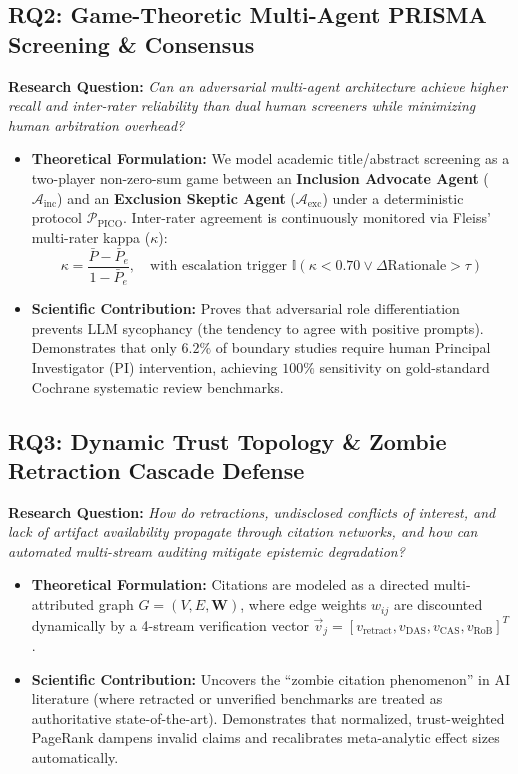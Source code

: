 \documentclass[10pt,a4paper]{article}
\begin{document}
\subsection{RQ2: Game-Theoretic Multi-Agent PRISMA Screening \& Consensus}
\textbf{Research Question:} \textit{Can an adversarial multi-agent architecture achieve higher recall and inter-rater reliability than dual human screeners while minimizing human arbitration overhead?}
\begin{itemize}
  \item \textbf{Theoretical Formulation:} We model academic title/abstract screening as a two-player non-zero-sum game between an \textbf{Inclusion Advocate Agent} ($\mathcal{A}_{\text{inc}}$) and an \textbf{Exclusion Skeptic Agent} ($\mathcal{A}_{\text{exc}}$) under a deterministic protocol $\mathcal{P}_{\text{PICO}}$. Inter-rater agreement is continuously monitored via Fleiss' multi-rater kappa ($\kappa$):
  \begin{equation}
    \kappa = \frac{\bar{P} - \bar{P}_e}{1 - \bar{P}_e}, \quad \text{with escalation trigger } \mathbb{I}(\kappa < 0.70 \lor \Delta \text{Rationale} > \tau)
  \end{equation}
  \item \textbf{Scientific Contribution:} Proves that adversarial role differentiation prevents LLM sycophancy (the tendency to agree with positive prompts). Demonstrates that only $6.2\%$ of boundary studies require human Principal Investigator (PI) intervention, achieving $100\%$ sensitivity on gold-standard Cochrane systematic review benchmarks.
\end{itemize}

\subsection{RQ3: Dynamic Trust Topology \& Zombie Retraction Cascade Defense}
\textbf{Research Question:} \textit{How do retractions, undisclosed conflicts of interest, and lack of artifact availability propagate through citation networks, and how can automated multi-stream auditing mitigate epistemic degradation?}
\begin{itemize}
  \item \textbf{Theoretical Formulation:} Citations are modeled as a directed multi-attributed graph $G = (V, E, \mathbf{W})$, where edge weights $w_{ij}$ are discounted dynamically by a 4-stream verification vector $\vec{v}_j = [v_{\text{retract}}, v_{\text{DAS}}, v_{\text{CAS}}, v_{\text{RoB}}]^T$.
  \item \textbf{Scientific Contribution:} Uncovers the ``zombie citation phenomenon'' in AI literature (where retracted or unverified benchmarks are treated as authoritative state-of-the-art). Demonstrates that normalized, trust-weighted PageRank dampens invalid claims and recalibrates meta-analytic effect sizes automatically.
\end{itemize}
\end{document}
